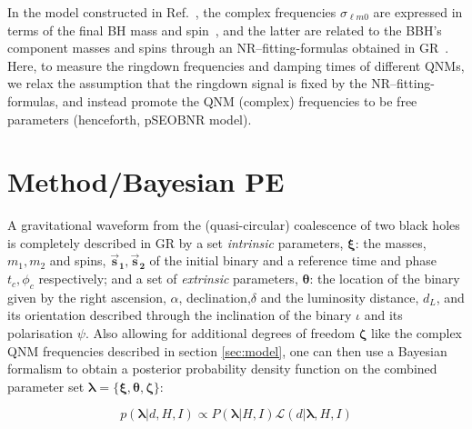 \documentclass[twocolumn,prd,superscriptaddress,amsfonts,amssymb,amsmath,preprintnumbers]{revtex4-1}
\newcommand{\blambda}{\bm{\lambda}}
\newcommand{\btheta}{\bm{\theta}}
\newcommand{\bxi}{\bm{\xi}}
\newcommand{\bzeta}{\bm{\zeta}}
\newcommand{\bs}[1]{\bm{\vec{s}_{#1}}}
\begin{document}
 
  In the model constructed in Ref.~\cite{Cotesta:2018fcv}, the complex frequencies $\sigma_{\ell m 0}$  are expressed in terms of the final BH mass and spin~\cite{Berti:2005ys,Berti:2009kk}, and the latter are related to the BBH's component masses and spins through an
  NR--fitting-formulas obtained in GR~\cite{Taracchini:2013rva,Hofmann:2016yih}. 
  Here, to measure the ringdown frequencies and damping times of
  different QNMs, we relax the assumption that the ringdown signal is
  fixed by the NR--fitting-formulas, and
  instead promote the QNM (complex) frequencies to be free
  parameters (henceforth, pSEOBNR model). 


\section{Method/Bayesian PE}\label{sec:method}

A gravitational waveform from the (quasi-circular) coalescence of two black holes is completely described in GR by a set \textit{intrinsic} parameters, $\bxi$: the masses, $m_1, m_2$ and spins, $\bs1, \bs2$ of the initial binary and a reference time and phase $t_c, \phi_c$ respectively; and a set of \textit{extrinsic} parameters, $\btheta$: the location of the binary given by the right ascension, $\alpha$, declination,$\delta$ and the luminosity distance, $d_L$, and its orientation described through the inclination of the binary $\iota$ and its polarisation $\psi$. Also allowing for additional degrees of freedom $\bzeta$ like the complex QNM frequencies described in section \ref{sec:model}, one can then use a Bayesian formalism to obtain a posterior probability density function on the combined parameter set $\blambda = \{\bxi, \btheta, \bzeta\}$:

\begin{equation}
p(\blambda | d, H, I) \propto P(\blambda | H,I) \mathcal{L}(d | \blambda, H, I)
\end{equation}
\end{document}
